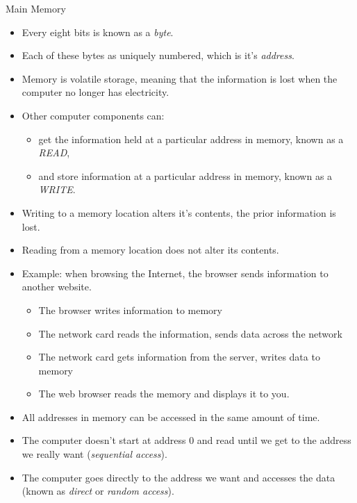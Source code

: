\documentclass[graphics]{beamer}
\begin{document}
\begin{frame}{Main Memory}
{\begin{itemize}
    \end{itemize}
}
 {
    \begin{itemize}
        \item Every eight bits is known as a \textit{byte}.
        \item Each of these bytes as uniquely numbered, which is it's \textit{address}.
        \item Memory is volatile storage, meaning that the information is lost when the computer no longer has electricity.
    \end{itemize}
}
 {
    \begin{itemize}
        \item Other computer components can:
        \begin{itemize}
            \item get the information held at a particular address in memory, known as a \textit{READ},
            \item and store information at a particular address in memory, known as a \textit{WRITE}.
        \end{itemize}
        \item Writing to a memory location alters it's contents, the prior information is lost.
        \item Reading from a memory location does not alter its contents.
        \item Example: when browsing the Internet, the browser sends information to another website.
        \begin{itemize}
            \item The browser writes information to memory
            \item The network card reads the information, sends data across the network
            \item The network card gets information from the server, writes data to memory
            \item The web browser reads the memory and displays it to you.
        \end{itemize}
    \end{itemize}
}
 {
    \begin{itemize}
        \item All addresses in memory can be accessed in the same amount of time.
        \item The computer doesn't start at address 0 and read until we get to the address we really want (\textit{sequential access}).
        \item The computer goes directly to the address we want and accesses the data (known as \textit{direct} or \textit{random access}).

\end{itemize}}
\end{frame}
\end{document}
